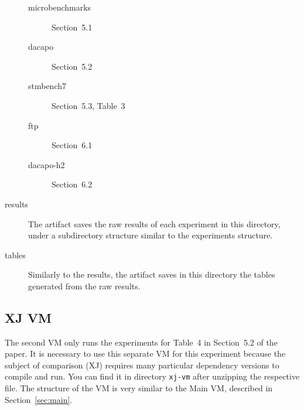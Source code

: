 \documentclass[12pt]{article}
\newcommand{\host}[1]{\colorbox{blue!20}{\texttt{\color{black}#1}}}
\begin{document}
\begin{description}
        \begin{description}

            \item[microbenchmarks] Section~5.1

            \item[dacapo] Section~5.2

            \item[stmbench7] Section~5.3, Table~3

            \item[ftp] Section~6.1

            \item[dacapo-h2] Section~6.2

        \end{description}

    \item[results]  The artifact saves the raw results of each experiment in
        this directory, under a subdirectory structure similar to the
        experiments structure.

    \item[tables]  Similarly to the results, the artifact saves in this
        directory the tables generated from the raw results.

\end{description}

\subsection{XJ VM}
\label{sec:xj}

The second VM only runs the experiments for Table~4 in Section~5.2 of the paper.
It is necessary to use this separate VM for this experiment because the subject of comparison (XJ) requires many particular dependency versions to compile and run.
You can find it in directory \host{xj-vm} after unzipping the
respective file.
The structure of the VM is very similar to the Main VM, described in
Section~\ref{sec:main}.
\end{document}
